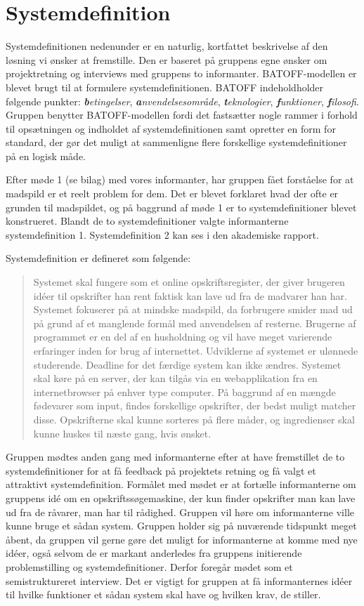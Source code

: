 \section{Systemdefinition}

Systemdefinitionen nedenunder er en naturlig, kortfattet beskrivelse af den løsning vi ønsker at fremstille. Den er baseret på gruppens egne ønsker om projektretning og interviews med gruppens to informanter. BATOFF-modellen er blevet brugt til at formulere systemdefinitionen. BATOFF indeholdholder følgende punkter: \emph{\textbf{b}etingelser}, \emph{\textbf{a}nvendelsesområde}, \emph{\textbf{t}eknologier}, \emph{\textbf{f}unktioner}, \emph{\textbf{f}ilosofi}. Gruppen benytter BATOFF-modellen fordi det fastsætter nogle rammer i forhold til opsætningen og indholdet af systemdefinitionen samt opretter en form for standard, der gør det muligt at sammenligne flere forskellige systemdefinitioner på en logisk måde.

Efter møde 1 (se bilag) med vores informanter, har gruppen fået forståelse for at madspild er et reelt problem for dem. Det er blevet forklaret hvad der ofte er grunden til madspildet, og på baggrund af møde 1 er to systemdefinitioner blevet konstrueret. Blandt de to systemdefinitioner valgte informanterne systemdefinition 1. Systemdefinition 2 kan ses i den akademiske rapport.

Systemdefinition er defineret som følgende:

\begin{quote}
Systemet skal fungere som et online opskriftsregister, der giver brugeren idéer til opskrifter han rent faktisk kan lave ud fra de madvarer han har. Systemet fokuserer på at mindske madspild, da forbrugere smider mad ud på grund af et manglende formål med anvendelsen af resterne. Brugerne af programmet er en del af en husholdning og vil have meget varierende erfaringer inden for brug af internettet. Udviklerne af systemet er ulønnede studerende. Deadline for det færdige system kan ikke ændres. Systemet skal køre på en server, der kan tilgås via en webapplikation fra en internetbrowser på enhver type computer. På baggrund af en mængde fødevarer som input, findes forskellige opskrifter, der bedst muligt matcher disse. Opskrifterne skal kunne sorteres på flere måder, og ingredienser skal kunne huskes til næste gang, hvis ønsket.
\end{quote}

Gruppen mødtes anden gang med informanterne efter at have fremstillet de to systemdefinitioner for at få feedback på projektets retning og få valgt et attraktivt systemdefinition. Formålet med mødet er at fortælle informanterne om gruppens idé om en opskriftssøgemaskine, der kun finder opskrifter man kan lave ud fra de råvarer, man har til rådighed. Gruppen vil høre om informanterne ville kunne bruge et sådan system. Gruppen holder sig på nuværende tidspunkt meget åbent, da gruppen vil gerne gøre det muligt for informanterne at komme med nye idéer, også selvom de er markant anderledes fra gruppens initierende problemstilling og systemdefinitioner. Derfor foregår mødet som et semistruktureret interview. Det er vigtigt for gruppen at få informanternes idéer til hvilke funktioner et sådan system skal have og hvilken krav, de stiller.

